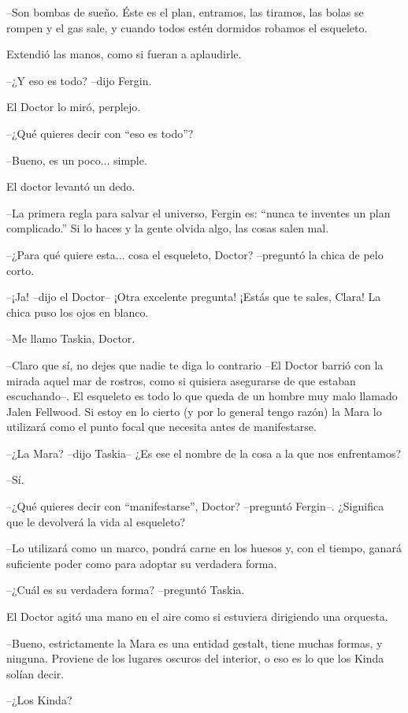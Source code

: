 --Son bombas de sueño. Éste es el plan, entramos, las tiramos, las bolas se rompen y el gas sale, y cuando todos estén dormidos robamos el esqueleto.

Extendió las manos, como si fueran a aplaudirle.

--¿Y eso es todo? --dijo Fergin.

El Doctor lo miró, perplejo. 

--¿Qué quieres decir con ``eso es todo''?

--Bueno, es un poco... simple.

El doctor levantó un dedo. 

--La primera regla para salvar el universo, Fergin es: ``nunca te inventes un plan complicado.'' Si lo haces y la gente olvida algo, las cosas salen mal.

--¿Para qué quiere esta... cosa el esqueleto, Doctor? --preguntó la chica de pelo corto.

--¡Ja! --dijo el Doctor-- ¡Otra excelente pregunta! ¡Estás que te sales, Clara!
La chica puso los ojos en blanco. 

--Me llamo Taskia, Doctor.

--Claro que sí, no dejes que nadie te diga lo contrario --El Doctor barrió con la mirada aquel mar de rostros, como si quisiera asegurarse de que estaban escuchando--. El esqueleto es todo lo que queda de un hombre muy malo llamado Jalen Fellwood. Si estoy en lo cierto (y por lo general tengo razón) la Mara lo utilizará como el punto focal que necesita antes de manifestarse.

--¿La Mara? --dijo Taskia-- ¿Es ese el nombre de la cosa a la que nos enfrentamos?

--Sí.

--¿Qué quieres decir con ``manifestarse'', Doctor? --preguntó Fergin--. ¿Significa que le devolverá la vida al esqueleto?

--Lo utilizará como un marco, pondrá carne en los huesos y, con el tiempo, ganará suficiente poder como para adoptar su verdadera forma.

--¿Cuál es su verdadera forma? --preguntó Taskia.

El Doctor agitó una mano en el aire como si estuviera dirigiendo una orquesta. 

--Bueno, estrictamente la Mara es una entidad gestalt, tiene muchas formas, y ninguna. Proviene de los lugares oscuros del interior, o eso es lo que los Kinda solían decir.

--¿Los Kinda?


